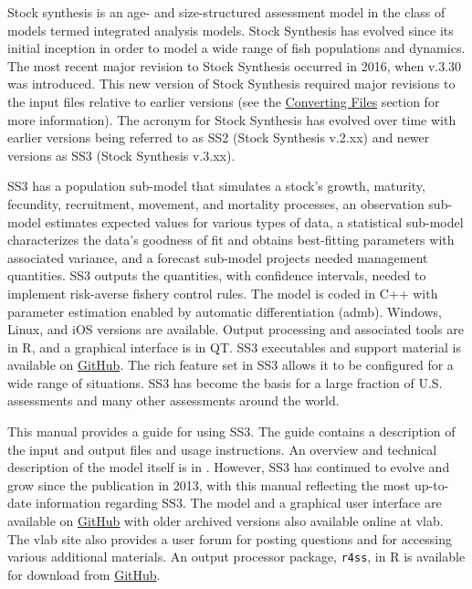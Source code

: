 Stock synthesis is an age- and size-structured assessment model in the class of models termed integrated analysis models. Stock Synthesis has evolved since its initial inception in order to model a wide range of fish populations and dynamics. The most recent major revision to Stock Synthesis occurred in 2016, when v.3.30 was introduced. This new version of Stock Synthesis required major revisions to the input files relative to earlier versions (see the \hyperlink{ConvIssues}{Converting Files} section for more information). The acronym for Stock Synthesis has evolved over time with earlier versions being referred to as SS2 (Stock Synthesis v.2.xx) and newer versions as SS3 (Stock Synthesis v.3.xx). 

SS3 has a population sub-model that simulates a stock's growth, maturity, fecundity, recruitment, movement, and mortality processes, an observation sub-model estimates expected values for various types of data, a statistical sub-model characterizes the data's goodness of fit and obtains best-fitting parameters with associated variance, and a forecast sub-model projects needed management quantities. SS3 outputs the quantities, with confidence intervals, needed to implement risk-averse fishery control rules. The model is coded in C++ with parameter estimation enabled by automatic differentiation (\gls{admb}). Windows, Linux, and iOS versions are available. Output processing and associated tools are in R, and a graphical interface is in QT. SS3 executables and support material is available on \href{https://github.com/nmfs-ost}{GitHub}. The rich feature set in SS3 allows it to be configured for a wide range of situations. SS3 has become the basis for a large fraction of U.S. assessments and many other assessments around the world.  

This manual provides a guide for using SS3. The guide contains a description of the input and output files and usage instructions. An overview and technical description of the model itself is in \citet{methotstock2013}. However, SS3 has continued to evolve and grow since the publication in 2013, with this manual reflecting the most up-to-date information regarding SS3. The model and a graphical user interface are available on \href{https://github.com/nmfs-ost}{GitHub} with older archived versions also available online at \gls{vlab}. The \gls{vlab} site also provides a user forum for posting questions and for accessing various additional materials. An output processor package, \texttt{r4ss}, in R is available for download from \href{https://github.com/r4ss/r4ss}{GitHub}.


